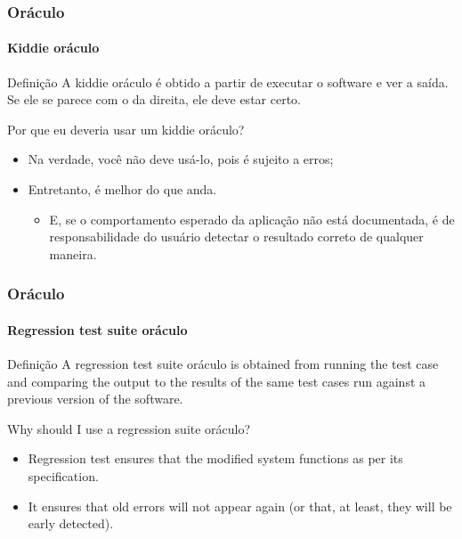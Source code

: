 \begin{frame}
\label{concept:kiddie-oráculo}
\frametitle{Oráculo}
\framesubtitle{Kiddie oráculo}

\begin{block:concept}{Definição}
A kiddie oráculo é obtido a partir de executar o software e ver a saída. Se ele se parece com o da direita, ele deve estar certo.
\end{block:concept}

\begin{block:fact}{Por que eu deveria usar um kiddie oráculo?}
\begin{itemize}
	\item Na verdade, você não deve usá-lo, pois é sujeito a erros;

	\item Entretanto, é melhor do que anda.
	\begin{itemize}
		\item E, se o comportamento esperado da aplicação não está documentada, é de responsabilidade do usuário detectar o resultado correto de qualquer maneira.
	\end{itemize}
\end{itemize}
\end{block:fact}

\hfill
{}
\end{frame}



\begin{frame}
\label{concept:regression-test-suite-oráculo}
\frametitle{Oráculo}
\framesubtitle{Regression test suite oráculo}

\begin{block:concept}{Definição}
A regression test suite oráculo  is obtained from running the test case and
comparing the output to the results of the same test cases run against a
previous version of the software.
\end{block:concept}

\begin{block:fact}{Why should I use a regression suite oráculo?}
\begin{itemize}
	\item Regression test ensures that the modified system functions as per
	its specification.

	\item It ensures that old errors will not appear again (or that, at least,
	they will be early detected).
\end{itemize}
\end{block:fact}

\hfill
{}
\end{frame}



